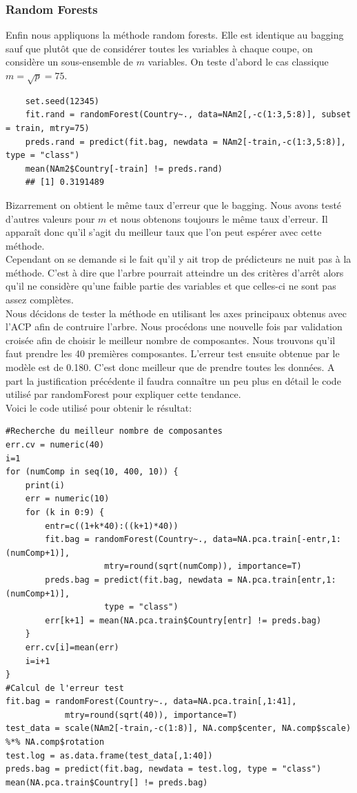\documentclass[12pt,a4paper]{article}
\begin{document}
\subsubsection{Random Forests}
Enfin nous appliquons la méthode random forests. Elle est identique au bagging sauf que plutôt que de considérer toutes les variables à chaque coupe, on considère un sous-ensemble de $m$ variables. On teste d'abord le cas classique $m=\sqrt{p} = 75$.\vspace{2mm}
\begin{lstlisting}
	set.seed(12345)
	fit.rand = randomForest(Country~., data=NAm2[,-c(1:3,5:8)], subset = train, mtry=75)
	preds.rand = predict(fit.bag, newdata = NAm2[-train,-c(1:3,5:8)], type = "class")
	mean(NAm2$Country[-train] != preds.rand)
	## [1] 0.3191489
\end{lstlisting}
Bizarrement on obtient le même taux d'erreur que le bagging. Nous avons testé
d'autres valeurs pour $m$ et nous obtenons toujours le même taux d'erreur. Il
apparaît donc qu'il s'agit du meilleur taux que l'on peut espérer avec cette
méthode.\vspace{3mm}\\
Cependant on se demande si le fait qu'il y ait trop de prédicteurs ne nuit pas
à la méthode. C'est à dire que l'arbre pourrait atteindre un des critères d'arrêt
alors qu'il ne considère qu'une faible partie des variables et que celles-ci ne
sont pas assez complètes. \\
Nous décidons de tester la méthode en utilisant les axes principaux obtenus avec 
l'ACP afin de contruire l'arbre. Nous procédons une nouvelle fois par validation
croisée afin de choisir le meilleur nombre de composantes. Nous trouvons qu'il 
faut prendre les 40 premières composantes. L'erreur test ensuite obtenue par le
modèle est de 0.180. C'est donc meilleur que de prendre toutes les données. A 
part la justification précédente il faudra connaître un peu plus en détail le
code utilisé par randomForest pour expliquer cette tendance. \\
Voici le code utilisé pour obtenir le résultat:\vspace{2mm}
\begin{lstlisting}
#Recherche du meilleur nombre de composantes
err.cv = numeric(40)
i=1
for (numComp in seq(10, 400, 10)) {
	print(i)
	err = numeric(10)
	for (k in 0:9) {
		entr=c((1+k*40):((k+1)*40))
		fit.bag = randomForest(Country~., data=NA.pca.train[-entr,1:(numComp+1)], 
					mtry=round(sqrt(numComp)), importance=T)
		preds.bag = predict(fit.bag, newdata = NA.pca.train[entr,1:(numComp+1)], 
					type = "class")
		err[k+1] = mean(NA.pca.train$Country[entr] != preds.bag)
	}
	err.cv[i]=mean(err)
	i=i+1
}
#Calcul de l'erreur test
fit.bag = randomForest(Country~., data=NA.pca.train[,1:41],
			mtry=round(sqrt(40)), importance=T)
test_data = scale(NAm2[-train,-c(1:8)], NA.comp$center, NA.comp$scale) %*% NA.comp$rotation
test.log = as.data.frame(test_data[,1:40])
preds.bag = predict(fit.bag, newdata = test.log, type = "class")
mean(NA.pca.train$Country[] != preds.bag)
\end{lstlisting}
\end{document}

